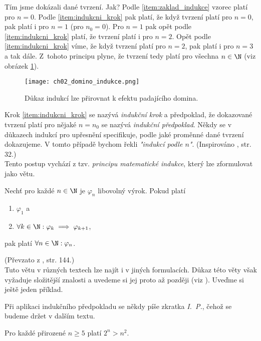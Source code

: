 Tím jsme dokázali dané tvrzení. Jak? Podle \ref{item:zaklad_indukce} vzorec platí pro $n=0$. Podle \ref{item:indukcni_krok} pak platí, že když tvrzení platí pro $n=0$, pak platí i pro $n=1$ (pro $n_0=0$). Pro $n=1$ pak opět podle \ref{item:indukcni_krok} platí, že tvrzení platí i pro $n=2$. Opět podle \ref{item:indukcni_krok} víme, že když tvrzení platí pro $n=2$, pak platí i pro $n=3$ a tak dále. Z~tohoto principu plyne, že tvrzení tedy platí pro všechna $n\in\N$ (viz obrázek \ref{fig:domino}).
\begin{figure}[h]
    \centering
    \texttt{[image: ch02\_domino\_indukce.png]}
    \caption{Důkaz indukcí lze přirovnat k efektu padajícího domina.}
    \label{fig:domino}
\end{figure}
Krok \ref{item:indukcni_krok} se nazývá \emph{indukční krok} a předpoklad, že dokazované tvrzení platí pro nějaké $n=n_0$ se nazývá \emph{indukční předpoklad}. Někdy se v důkazech indukcí pro upřesnění specifikuje, podle jaké proměnné dané tvrzení dokazujeme. V tomto případě bychom řekli \emph{"indukcí podle $n$"}. (Inspirováno \cite{MatousekNesetril2009}, str. 32.)\\
Tento postup vychází z tzv. \emph{principu matematické indukce}, který lze zformulovat jako větu.
\begin{theorem}
    Nechť pro každé $n\in\N$ je $\varphi_n$ libovolný výrok. Pokud platí
    \begin{enumerate}[label=(\roman*)]
        \item $\varphi_1$ a
        \item $\forall k\in\N: \varphi_k \implies \varphi_{k+1}$,
    \end{enumerate}
    pak platí $\forall n\in\N: \varphi_n$.
\end{theorem}
(Převzato z \cite{ChartrandPolimeniZhang2014}, str. 144.)\\
Tuto větu v různých textech lze najít i v jiných formulacích. Důkaz této věty však vyžaduje složitější znalosti a uvedeme si jej proto až později (viz ). Uveďme si ještě jeden příklad.
\begin{convention}
    Při aplikaci indukčního předpokladu se někdy píše zkratka \emph{I.~P.}, čehož se budeme držet v dalším textu.
\end{convention}
\begin{proposition}
    Pro každé přirozené $n\geq 5$ platí $2^n>n^2$.
\end{proposition}
